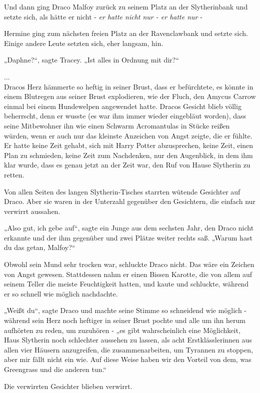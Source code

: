 {Und dann ging Draco Malfoy zurück zu seinem Platz an der Slytherinbank und setzte sich, als hätte er nicht - \emph{er hatte nicht nur - er hatte nur} -

Hermine ging zum nächsten freien Platz an der Ravenclawbank und setzte sich. Einige andere Leute setzten sich, eher langsam, hin.

„Daphne?“, sagte Tracey. „Ist alles in Ordnung mit dir?“

...\\ Dracos Herz hämmerte so heftig in seiner Brust, dass er befürchtete, es könnte in einem Blutregen aus seiner Brust explodieren, wie der Fluch, den Amycus Carrow einmal bei einem Hundewelpen angewendet hatte. Dracos Gesicht blieb völlig beherrscht, denn er wusste (es war ihm immer wieder eingebläut worden), dass seine Mitbewohner ihn wie einen Schwarm Acromantulas in Stücke reißen würden, wenn er auch nur das kleinste Anzeichen von Angst zeigte, die er fühlte. Er hatte keine Zeit gehabt, sich mit Harry Potter abzusprechen, keine Zeit, einen Plan zu schmieden, keine Zeit zum Nachdenken, nur den Augenblick, in dem ihm klar wurde, dass es genau jetzt an der Zeit war, den Ruf von Hause Slytherin zu retten.

Von allen Seiten des langen Slytherin-Tisches starrten wütende Gesichter auf Draco. Aber sie waren in der Unterzahl gegenüber den Gesichtern, die einfach nur verwirrt aussahen.

„Also gut, ich gebe auf“, sagte ein Junge aus dem sechsten Jahr, den Draco nicht erkannte und der ihm gegenüber und zwei Plätze weiter rechts saß. „Warum hast du das getan, Malfoy?“

Obwohl sein Mund sehr trocken war, schluckte Draco nicht. Das wäre ein Zeichen von Angst gewesen. Stattdessen nahm er einen Bissen Karotte, die von allem auf seinem Teller die meiste Feuchtigkeit hatten, und kaute und schluckte, während er so schnell wie möglich nachdachte.

„Weißt du“, sagte Draco und machte seine Stimme so schneidend wie möglich - während sein Herz noch heftiger in seiner Brust pochte und alle um ihn herum aufhörten zu reden, um zuzuhören - „es gibt wahrscheinlich eine Möglichkeit, Haus Slytherin noch schlechter aussehen zu lassen, als acht Erstklässlerinnen aus allen vier Häusern anzugreifen, die zusammenarbeiten, um Tyrannen zu stoppen, aber mir fällt nicht ein wie. Auf diese Weise haben wir den Vorteil von dem, was Greengrass und die anderen tun.“

Die verwirrten Gesichter blieben verwirrt.

}
